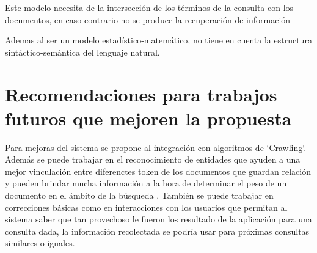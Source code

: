 \documentclass{llncs}
\begin{document}
Este modelo necesita de la intersecci\'on de los t\'erminos de la consulta con los documentos, en caso contrario no se produce la recuperaci\'on de informaci\'on

Ademas al ser un modelo estad\'istico-matem\'atico, no tiene en cuenta la estructura sintáctico-semántica del lenguaje natural.

%
\section{Recomendaciones para trabajos futuros que mejoren la propuesta}

Para mejoras del sistema se propone al integraci\'on con algoritmos de `Crawling`. Adem\'as se puede trabajar en el reconocimiento de entidades que ayuden a una mejor vinculaci\'on entre diferenctes token de los documentos que guardan relaci\'on y pueden brindar mucha informaci\'on a la hora de determinar el peso de un documento en el \'ambito de la b\'usqueda . Tambi\'en se puede trabajar en correcciones b\'asicas como en interacciones con los usuarios que permitan al sistema saber que tan provechoso le fueron los resultado de la aplicaci\'on para una consulta dada, la informaci\'on recolectada se podr\'ia usar para pr\'oximas consultas similares o iguales.
%
\end{document}
